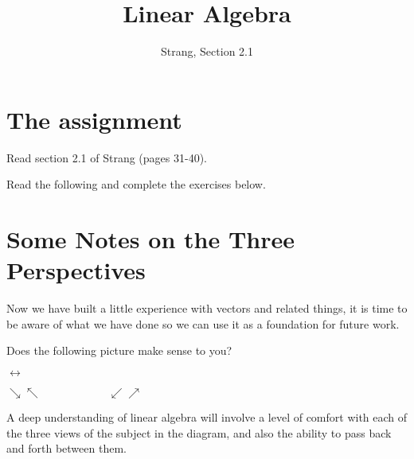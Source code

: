 \documentclass[11pt]{amsart}
\theoremstyle{definition}
\begin{document}
\title{Linear Algebra}
\author{Strang, Section 2.1}
\maketitle

\section{The assignment}
\begin{compactitem}
\item Read section 2.1 of Strang (pages 31-40).
\item Read the following and complete the exercises below.
\end{compactitem}


\section{Some Notes on the Three Perspectives}

Now we have built a little experience with vectors and related things, it is time to be aware of what we have done so we can use it as a foundation for future work.

Does the following picture make sense to you?


 $\longleftrightarrow$
\begin{center}
$\searrow\nwarrow \hspace{1in} \swarrow\nearrow$\\
\end{center}

A deep understanding of linear algebra will involve a level of comfort with each of the three views of the subject in the diagram, and also the ability to pass back and forth between them.
\end{document}
